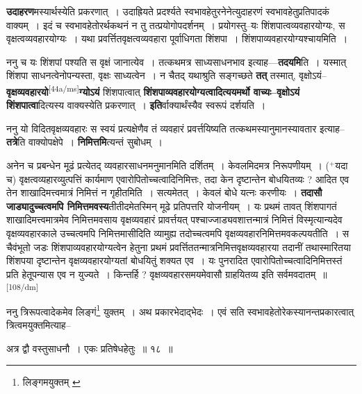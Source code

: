 \documentclass[article,12pt,a4paper]{memoir}
\newcommand{\add}[1]{($^{+}$#1)}
\begin{document}
	  \pstart \textbf{उदाहरण}मस्यार्थस्येति प्रकरणात् । उदाह्रियते प्रदर्श्यते स्वभावहेतुरनेनेत्युदाहरणं स्वभावहेतुप्रतिपादकं वाक्यम् । इदं च स्वभावहेतोरर्थकथनं न तु तत्प्रयोगोपदर्शनम् । प्रयोगस्तु--यः शिंशपात्वव्यवहारयोग्यः, स वृक्षत्वव्यवहारयोग्यः । यथा प्रवर्त्तितवृक्षत्वव्यवहारा पूर्वाधिगता शिंशपा । शिंशपाव्यवहारयोग्यश्चायमिति ।
	\pend
      

	  \pstart ननु च यः शिंशपां पश्यति स वृक्षं जानात्येव । तत्कथमत्र साध्यसाधनभाव इत्याह—\textbf{तदयमि}ति । यस्मात् शिंशपा साधनत्वेनोपन्यस्ता, वृक्षः साध्यत्वेन । न चैतद् यथाश्रुति सङ्गच्छते \textbf{तत्} तस्मात्, वृक्षोऽयं--\textbf{वृक्षव्यवहारयो}\leavevmode\textsuperscript{\rmlatinfont\tiny [44a/ms]}\textbf{ग्योऽयं} शिंशपात्वात् \textbf{शिंशपाव्यवहारयोग्यत्वादित्ययमर्थो वाच्यः--वृक्षोऽयं शिंशपात्वा}दित्यस्य वाक्यस्येति प्रकरणात् । \textbf{इति}र्वाक्यार्थंस्यैव स्वरूपं दर्शयति ।
	\pend
      

	  \pstart ननु यो विदितवृक्षव्यवहारः स स्वयं प्रत्यक्षेणैव तं व्यवहारं प्रवर्त्तयिष्यति तत्कथमस्यानुमानस्यावतार इत्याह--\textbf{तत्रे}ति वाक्योपक्षेपे । \textbf{निमित्तमि}त्यन्तं सुबोधम् ।
	\pend
      

	  \pstart अनेन च प्रबन्धेन मूढं प्रत्येतद् व्यवहारसाधनमनुमानमिति दर्शितम् । केवलमिदमत्र निरूपणीयम् । \add{यदा च} वृक्षत्वव्यहारव्युत्पत्तिं कार्यमाण एवारोपितोच्चत्वादिनिमित्तः, तदा केन दृष्टान्तेन बोधयितव्यः ? आदित एव तेन शाखादिमत्त्वमात्रं निमित्तं न गृहीतमिति । सत्यमेतत् । केवलं बोधे यत्नः करणीयः । \textbf{तदासौ जाड्यादुच्चत्वमपि निमित्तमवस्य}तीतीदमेतस्मिन् मूढे प्रतिपत्तरि योजनीयम् । यः प्रथमं तावत् शिंशपागतं शाखादिमत्त्वमात्रमेव निमित्तमवसाय वृक्षव्यवहारं प्रावर्त्तयत् पश्चाज्जाड्यवशात्तन्मात्रं निमित्तं विस्मृत्यान्यदेव वृक्षव्यवहारकाले उच्चत्वमपि निमित्तमासीदिति व्यामुह्य तदोच्चत्वमपि वृक्षव्यवहारनिमित्तमवकल्पयतीति । स चैवंभूतो जडः शिंशपाव्यवहारयोग्यत्वेन हेतुना प्रथमं प्रवर्त्तिततन्मात्रनिमित्तवृक्षव्यवहारया तदानीं तथास्मारितया शिंशपया दृष्टान्तेन वृक्षव्यवहारयोग्यतां बोधयितुं शक्यत एव । यः पुनरादित एवारोपितोच्चत्वादिनिमित्तस्तं प्रति हेतूपन्यास एव न युज्यते । किन्तर्हि ? वृक्षव्यवहारसमयमेवासौ ग्राहयितव्य इति सर्वमवदातम् ॥
	\pend
      \leavevmode\textsuperscript{\rmlatinfont\tiny [108/dm]}

	  \pstart ननु त्रिरूपत्वादेकमेव लिङ्गं\footnote{लिङ्गमयुक्तम् \cite{dp-msB} \cite{dp-msC} \cite{dp-msD} \cite{dp-edP} \cite{dp-edH} \cite{dp-edE} \cite{dp-edN}} युक्तम् । अथ प्रकारभेदाद्भेदः । एवं सति स्वभावहेतोरेकस्यानन्तप्रकारत्वात् त्रित्वमयुक्तमित्याह--
	\pend
       

	  \pstart अत्र द्वौ वस्तुसाधनौ । एकः प्रतिषेधहेतुः ॥ १८ ॥
	\pend
       
\end{document}
